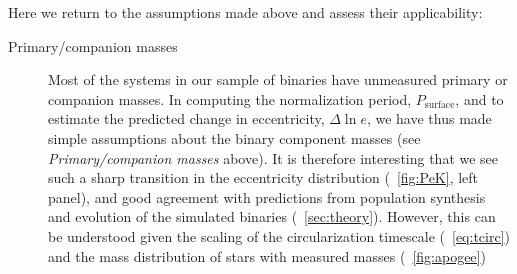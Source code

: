 \documentclass[modern, letterpaper]{aastex62}
\newcommand{\Psurf}{\ensuremath{P_\textrm{surface}}}
\begin{document}
Here we return to the assumptions made above and assess their applicability:
\begin{description}
    \item[Primary/companion masses] Most of the systems in our sample of
    binaries have unmeasured primary or companion masses.
    In computing the normalization period, \Psurf, and to estimate the predicted
    change in eccentricity, $\Delta \ln e$, we have thus made simple assumptions
    about the binary component masses (see \emph{Primary/companion masses}
    above).
    It is therefore interesting that we see such a sharp transition in the
    eccentricity distribution (\figurename~\ref{fig:PeK}, left panel), and good
    agreement with predictions from population synthesis and evolution of the
    simulated binaries (\sectionname~\ref{sec:theory}).
    However, this can be understood given the scaling of the circularization
    timescale (\eqname~\ref{eq:tcirc}) and the mass distribution of stars with
    measured masses (\figurename~\ref{fig:apogee})


\end{description}
\end{document}
